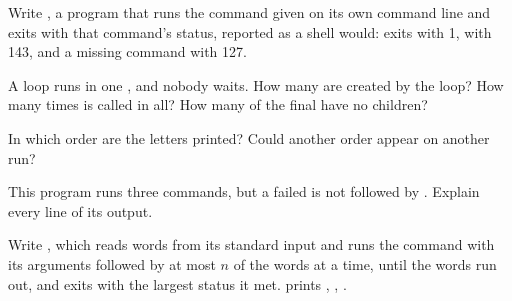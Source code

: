 \begin{exercise}[$\star$]\label{exo:b2:processes-and-system-calls:3}
Write , a program that runs the command given on its own command line and exits with that command's
status, reported as a shell would:  exits with 1,  with 143, and a
missing command with 127.
\end{exercise}

\begin{exercise}[$\star$]\label{exo:b2:processes-and-system-calls:4}
A loop  runs in one , and nobody waits. How many  are
created by the loop? How many times is  called in all? How many of the final  have no children?
\end{exercise}

\begin{exercise}[$\star\star$]\label{exo:b2:processes-and-system-calls:5}
In which order are the letters printed? Could another order appear on another run?
\end{exercise}

\begin{exercise}[$\star\star$]\label{exo:b2:processes-and-system-calls:6}
This program runs three commands, but a failed  is not followed by . Explain every line of its output.
\end{exercise}

\begin{exercise}[$\star\star$]\label{exo:b2:processes-and-system-calls:7}
Write , which reads words from its standard input and runs the command with
its arguments followed by at most $n$ of the words at a time, until the words run out, and exits with the largest
status it met.  prints , , .
\end{exercise}

